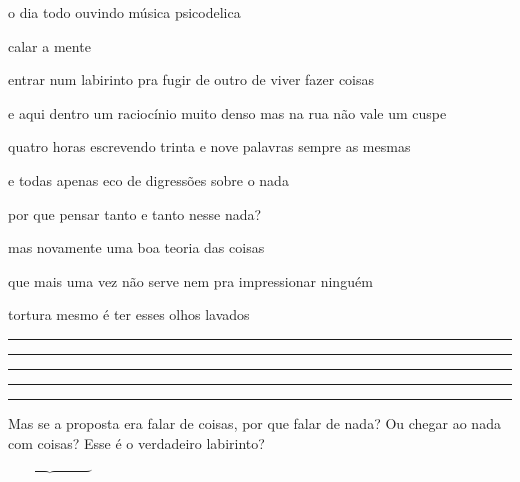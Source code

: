 \begin{poem}
\begin{stanza}
o dia todo ouvindo\verseline
música psicodelica
\end{stanza}
\begin{stanza}
calar a mente
\end{stanza}
\begin{stanza}
entrar num labirinto\verseline
pra fugir de outro\verseline
de viver\verseline
\quad fazer coisas
\end{stanza}
\begin{stanza}
e aqui dentro\verseline
um raciocínio muito denso\verseline
mas na rua\verseline
não vale um cuspe
\end{stanza}
\begin{stanza}
quatro horas escrevendo\verseline
trinta e nove palavras\verseline
sempre as mesmas
\end{stanza}
\begin{stanza}
e todas apenas eco\verseline
de digressões\verseline
sobre o nada
\end{stanza}
\begin{stanza}
por que pensar tanto\verseline
e tanto nesse nada?
\end{stanza}
\begin{stanza}
mas novamente\verseline
uma boa teoria\verseline
das coisas
\end{stanza}
\begin{stanza}
que mais uma vez\verseline
não serve nem\verseline
pra impressionar ninguém
\end{stanza}
\begin{stanza}
tortura mesmo\verseline
é ter esses olhos lavados
\end{stanza}
\begin{stanza}
\raisebox{-1.19ex}{*} \rule{1cm}{0.4pt} \raisebox{-1.19ex}{*} \rule{1cm}{0.4pt} \raisebox{-1.19ex}{*} \rule{1cm}{0.4pt} \raisebox{-1.19ex}{*} \rule{1cm}{0.4pt} \raisebox{-1.19ex}{*} \rule{1cm}{0.4pt} \raisebox{-1.19ex}{*}
\end{stanza}
\end{poem}
\vfill
\begin{justify}Mas se a proposta era falar de coisas, por que falar de nada? Ou chegar ao nada com coisas? Esse é o verdadeiro labirinto?\end{justify}
$\underbrace{\qquad \qquad \qquad}$